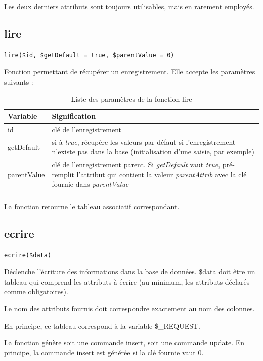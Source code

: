 Les deux derniers attributs sont toujours utilisables, mais en rarement employés.

\subsection{lire}
\begin{lstlisting}
lire($id, $getDefault = true, $parentValue = 0)
\end{lstlisting}

Fonction permettant de récupérer un enregistrement. Elle accepte les paramètres suivants :
\begin{longtable}{|p{3cm}|p{10cm}|}
\hline
\textbf{Variable} & \textbf{Signification} \\
\hline
\endhead
id & clé de l'enregistrement \\

getDefault & si à \textit{true}, récupère les valeurs par défaut si l'enregistrement n'existe pas dans la base (initialisation d'une saisie, par exemple)\\

parentValue & clé de l'enregistrement parent. Si \textit{getDefault} vaut \textit{true}, pré-remplit l'attribut qui contient la valeur \textit{parentAttrib} avec la clé fournie dans \textit{parentValue} \\
\hline

\caption{Liste des paramètres de la fonction lire}
\end{longtable}

La fonction retourne le tableau associatif correspondant.

\subsection{ecrire}
\begin{lstlisting}
ecrire($data)
\end{lstlisting}
Déclenche l'écriture des informations dans la base de données. \$data doit être un tableau qui comprend les attributs à écrire (au minimum, les attributs déclarés comme obligatoires).

Le nom des attributs fournis doit correspondre exactement au nom des colonnes.

En principe, ce tableau correspond à la variable \$\_REQUEST.

La fonction génère soit une commande insert, soit une commande update. En principe, la commande insert est générée si la clé fournie vaut 0.

